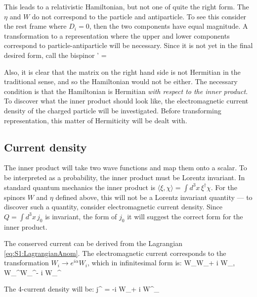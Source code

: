 This leads to a relativistic Hamiltonian, but not one of quite the right form.  The $\eta$ and $W$ do not correspond to the particle and antiparticle.  To see this consider the rest frame where $D_i =0$, then the two components have equal magnitude.  A transformation to a representation where the upper and lower components correspond to particle-antiparticle will be necessary.  Since it is not yet in the final desired form, call the bispinor
 \beq
 	\Upsilon' = 
 \eeq

Also, it is clear that the matrix on the right hand side is not Hermitian in the traditional sense, and so the Hamiltonian would not be either.  The necessary condition is that the Hamiltonian is Hermitian \emph{ with respect to the inner product}.  To discover what the inner product should look like, the electromagnetic current density of the charged particle will be investigated.  Before transforming representation, this matter of Hermiticity will be dealt with.


\subsection{Current density }

The inner product will take two wave functions and map them onto a scalar.  To be interpreted as a probability, the inner product must be Lorentz invariant.  In standard quantum mechanics the inner product is $\langle \xi, \chi \rangle = \int d^3x \, \xi^\dagger \chi$.  For the spinors $W$ and $\eta$ defined above, this will not be a Lorentz invariant quantity --- to discover such a quantity, consider electromagnetic current density.  Since $Q =  \int d^3x \, j_0$ is invariant, the form of $j_0$ it will suggest the correct form for the inner product.

The conserved current can be derived from the Lagrangian \eqref{eq:S1:LagrangianAnom}.  The electromagnetic current corresponds to the transformation $ W_i \to e^{i \alpha}W_i $, which in infinitesimal form is:
\beq
	W_\mu \to W_\mu + i \alpha W_\mu, \;
	W_\mu^\dagger \to W_\mu^\dagger - i \alpha W_\mu^{\dagger}
\eeq

The 4-current density will be:
\beq
	j^{\sigma} = -i  W_\mu  +  i W^\dagger_\mu
\eeq

